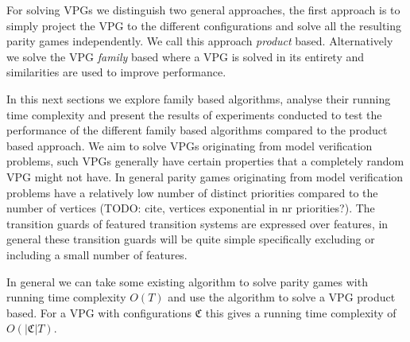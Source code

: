 For solving VPGs we distinguish two general approaches, the first approach is to simply project the VPG to the different configurations and solve all the resulting parity games independently. We call this approach \textit{product} based. Alternatively we solve the VPG \textit{family} based where a VPG is solved in its entirety and similarities are used to improve performance. 

In this next sections we explore family based algorithms, analyse their running time complexity and present the results of experiments conducted to test the performance of the different family based algorithms compared to the product based approach. We aim to solve VPGs originating from model verification problems, such VPGs generally have certain properties that a completely random VPG might not have. In general parity games originating from model verification problems have a relatively low number of distinct priorities compared to the number of vertices (TODO: cite, vertices exponential in nr priorities?). The transition guards of featured transition systems are expressed over features, in general these transition guards will be quite simple specifically excluding or including a small number of features.

In general we can take some existing algorithm to solve parity games with running time complexity $O(T)$ and use the algorithm to solve a VPG product based. For a VPG with configurations $\mathfrak{C}$ this gives a running time complexity of $O(|\mathfrak{C}|T)$.
